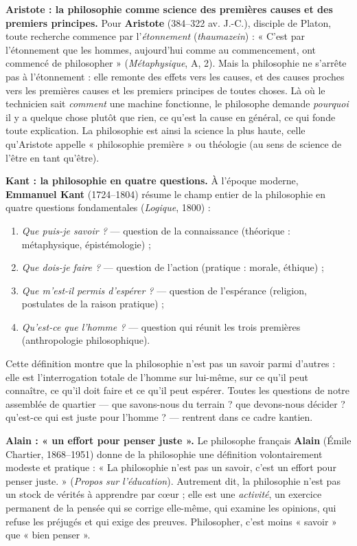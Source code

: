 \documentclass[11pt]{article}
\newcommand{\cle}[1]{{\popxbold\color{popdark}#1}}
\begin{document}
\textbf{Aristote : la philosophie comme science des premières causes et des premiers principes.} Pour \textbf{Aristote} (384--322 av. J.-C.), disciple de Platon, toute recherche commence par l'\emph{étonnement} (\emph{thaumazein}) : « C'est par l'étonnement que les hommes, aujourd'hui comme au commencement, ont commencé de philosopher » (\emph{Métaphysique}, A, 2). Mais la philosophie ne s'arrête pas à l'étonnement : elle remonte des effets vers les causes, et des causes proches vers les \cle{premières causes} et les \cle{premiers principes} de toutes choses. Là où le technicien sait \emph{comment} une machine fonctionne, le philosophe demande \emph{pourquoi} il y a quelque chose plutôt que rien, ce qu'est la cause en général, ce qui fonde toute explication. La philosophie est ainsi la science la plus haute, celle qu'Aristote appelle « philosophie première » ou théologie (au sens de science de l'être en tant qu'être).

\textbf{Kant : la philosophie en quatre questions.} À l'époque moderne, \textbf{Emmanuel Kant} (1724--1804) résume le champ entier de la philosophie en quatre questions fondamentales (\emph{Logique}, 1800) :
\begin{enumerate}
\item \emph{Que puis-je savoir ?} — question de la connaissance (théorique : métaphysique, épistémologie) ;
\item \emph{Que dois-je faire ?} — question de l'action (pratique : morale, éthique) ;
\item \emph{Que m'est-il permis d'espérer ?} — question de l'espérance (religion, postulates de la raison pratique) ;
\item \emph{Qu'est-ce que l'homme ?} — question qui réunit les trois premières (anthropologie philosophique).
\end{enumerate}
Cette définition montre que la philosophie n'est pas un savoir parmi d'autres : elle est l'interrogation totale de l'homme sur lui-même, sur ce qu'il peut connaître, ce qu'il doit faire et ce qu'il peut espérer. Toutes les questions de notre assemblée de quartier — que savons-nous du terrain ? que devons-nous décider ? qu'est-ce qui est juste pour l'homme ? — rentrent dans ce cadre kantien.

\textbf{Alain : « un effort pour penser juste ».} Le philosophe français \textbf{Alain} (Émile Chartier, 1868--1951) donne de la philosophie une définition volontairement modeste et pratique : « La philosophie n'est pas un savoir, c'est un \cle{effort pour penser juste}. » (\emph{Propos sur l'éducation}). Autrement dit, la philosophie n'est pas un stock de vérités à apprendre par cœur ; elle est une \emph{activité}, un exercice permanent de la pensée qui se corrige elle-même, qui examine les opinions, qui refuse les préjugés et qui exige des preuves. Philosopher, c'est moins « savoir » que « bien penser ».
\end{document}
